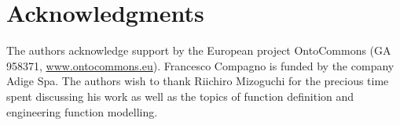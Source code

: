 \documentclass[sw]{iosart2x}
\begin{document}
\section*{Acknowledgments}


The authors acknowledge support by the European project OntoCommons (GA 958371, \url{www.ontocommons.eu}). Francesco Compagno is funded by the company Adige Spa. 
The authors wish to thank Riichiro Mizoguchi for the precious time spent discussing his work as well as the topics of function definition and engineering function modelling.





           
        
\end{document}

